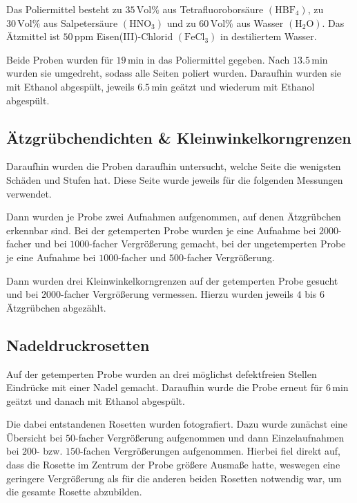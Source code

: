 \documentclass[12pt,a4paper]{scrartcl}
\numberwithin{equation}{section} %
\renewcommand{\[}{} %
\renewcommand{\]}{\noindent} %
\begin{document}
Das Poliermittel besteht zu \(35\,\mathrm{Vol\%}\) aus
Tetrafluoroborsäure \((\mathrm{HBF_4})\), zu \(30\,\mathrm{Vol\%}\) aus
Salpetersäure \((\mathrm{HNO_3})\) und zu \(60\,\mathrm{Vol\%}\) aus
Wasser \((\mathrm{H_2O})\). Das Ätzmittel ist \(50\,\mathrm{ppm}\)
Eisen(III)-Chlorid \((\mathrm{FeCl_3})\) in destiliertem Wasser.

Beide Proben wurden für \(19\mathrm{\,min}\) in das Poliermittel
gegeben. Nach \(13.5\mathrm{\,min}\) wurden sie umgedreht, sodass alle
Seiten poliert wurden. Daraufhin wurden sie mit Ethanol abgespült,
jeweils \(6.5\mathrm{\,min}\) geätzt und wiederum mit Ethanol abgespült.

\hypertarget{uxe4tzgruxfcbchendichten-kleinwinkelkorngrenzen}{%
\subsection{Ätzgrübchendichten \&
Kleinwinkelkorngrenzen}\label{uxe4tzgruxfcbchendichten-kleinwinkelkorngrenzen}}

Daraufhin wurden die Proben daraufhin untersucht, welche Seite die
wenigsten Schäden und Stufen hat. Diese Seite wurde jeweils für die
folgenden Messungen verwendet.

Dann wurden je Probe zwei Aufnahmen aufgenommen, auf denen
Ätzgrübchen erkennbar sind. Bei der getemperten Probe wurden je eine
Aufnahme bei \(2000\)-facher und bei \(1000\)-facher Vergrößerung
gemacht, bei der ungetemperten Probe je eine Aufnahme bei
\(1000\)-facher und \(500\)-facher Vergrößerung.

Dann wurden drei Kleinwinkelkorngrenzen auf der getemperten Probe
gesucht und bei \(2000\)-facher Vergrößerung vermessen. Hierzu wurden
jeweils \(4\) bis \(6\) Ätzgrübchen abgezählt.

\hypertarget{nadeldruckrosetten}{%
\subsection{Nadeldruckrosetten}\label{nadeldruckrosetten}}

Auf der getemperten Probe wurden an drei möglichst defektfreien Stellen
Eindrücke mit einer Nadel gemacht. Daraufhin wurde die Probe erneut für
\(6\mathrm{\,min}\) geätzt und danach mit Ethanol abgespült.

Die dabei entstandenen Rosetten wurden fotografiert. Dazu wurde zunächst
eine Übersicht bei \(50\)-facher Vergrößerung aufgenommen und dann
Einzelaufnahmen bei \(200\)- bzw. \(150\)-fachen Vergrößerungen
aufgenommen. Hierbei fiel direkt auf, dass die Rosette im Zentrum der
Probe größere Ausmaße hatte, weswegen eine geringere Vergrößerung als
für die anderen beiden Rosetten notwendig war, um die gesamte Rosette
abzubilden.
\end{document}
